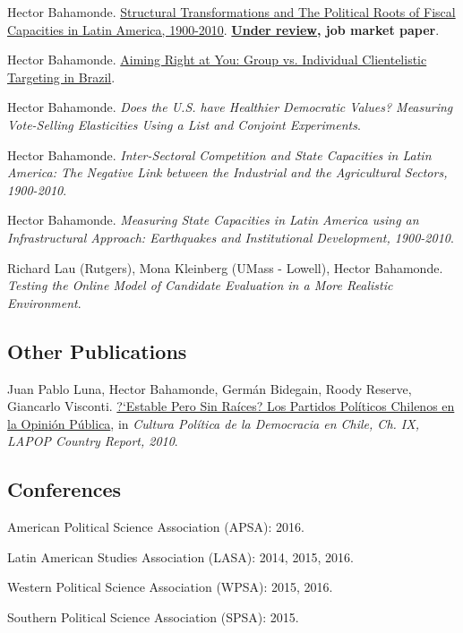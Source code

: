 \documentclass[letterpaper]{article}
\renewenvironment{itemize}{
  \begin{list}{}{
    \setlength{\leftmargin}{1.5em}
  }
}{
  \end{list}
}
\begin{document}
\begin{itemize}
\item Hector Bahamonde. \href{http://github.com/hbahamonde/IncomeTaxAdoption/raw/master/Bahamonde_IncomeTaxAdoption.pdf}{Structural Transformations and The Political Roots of Fiscal Capacities in Latin America, 1900-2010}. {\bf \underline{Under review}, job market paper}.
\item Hector Bahamonde. \href{http://github.com/hbahamonde/Clientelism_paper/raw/master/Bahamonde_Clientelism_Paper.pdf}{Aiming Right at You: Group vs. Individual Clientelistic Targeting in Brazil}.
\item Hector Bahamonde. \emph{Does the U.S. have Healthier Democratic Values? Measuring Vote-Selling Elasticities Using a List and Conjoint Experiments}.
\item Hector Bahamonde. \emph{Inter-Sectoral Competition and State Capacities in Latin America: The Negative Link between the Industrial and the Agricultural Sectors, 1900-2010}.
\item Hector Bahamonde. \emph{Measuring State Capacities in Latin America using an Infrastructural Approach: Earthquakes and Institutional Development, 1900-2010}.
\item Richard Lau (Rutgers), Mona Kleinberg (UMass - Lowell), Hector Bahamonde. \emph{Testing the Online Model of Candidate Evaluation in a More Realistic Environment}.
\end{itemize}

\subsection*{Other Publications}

\begin{itemize}
\item Juan Pablo Luna, Hector Bahamonde, Germ\'an Bidegain, Roody Reserve, Giancarlo Visconti. \href{http://www.vanderbilt.edu/lapop/chile/Chile-2010-cultura-politica.pdf}{?`Estable Pero Sin Ra\'ices? Los Partidos Pol\'iticos Chilenos en la Opini\'on P\'ublica}, in \emph{Cultura Pol\'itica de la Democracia en Chile, Ch. IX, LAPOP Country Report, 2010}.
\end{itemize}

\subsection*{Conferences}

\begin{itemize}
\item American Political Science Association (APSA): 2016.
\item Latin American Studies Association (LASA): 2014, 2015, 2016.
\item Western Political Science Association (WPSA): 2015, 2016.
\item Southern Political Science Association (SPSA): 2015.
\end{itemize}
\end{document}
